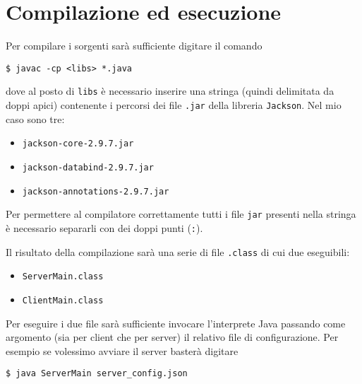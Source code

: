 \section{Compilazione ed esecuzione}
Per compilare i sorgenti sarà sufficiente digitare il comando
\begin{center}
	\verb|$ javac -cp <libs> *.java|
\end{center}
dove al posto di \verb|libs| è necessario inserire una stringa (quindi delimitata da doppi apici)
contenente i percorsi dei file \verb|.jar| della libreria \verb|Jackson|. Nel mio caso sono tre:
\begin{itemize}
	\item \verb|jackson-core-2.9.7.jar|
	\item \verb|jackson-databind-2.9.7.jar|
	\item \verb|jackson-annotations-2.9.7.jar|
\end{itemize}
Per permettere al compilatore correttamente tutti i file \verb|jar| presenti nella stringa è
necessario separarli con dei doppi punti (\verb|:|).

Il risultato della compilazione sarà una serie di file \verb|.class| di cui due eseguibili:
\begin{itemize}
	\item \verb|ServerMain.class|
	\item \verb|ClientMain.class|
\end{itemize}
Per eseguire i due file sarà sufficiente invocare l'interprete Java passando come argomento (sia
per client che per server) il relativo file di configurazione. Per esempio se volessimo avviare il
server basterà digitare
\begin{center}
	\verb|$ java ServerMain server_config.json|
\end{center}
